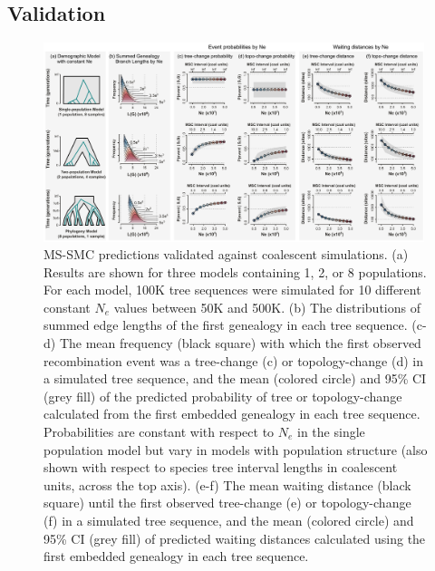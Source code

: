 \documentclass[11pt]{article}
\begin{document}
\subsection{Validation}

\begin{figure}[tp]
	\centering
	\includegraphics[width=0.99\textwidth]{figures/current/Fig5-validation-sims-NEW4.pdf}
	\caption{
		MS-SMC predictions validated against coalescent simulations.
		(a) Results are shown for three models containing 1, 2, or 8 
		populations. 
		For each model, 100K tree sequences were simulated for 10 different
		constant $N_e$ values between 50K and 500K. 
		(b) The distributions of summed edge lengths of the first genealogy in 
		each tree sequence. 
		(c-d) The mean frequency (black square) with which the first observed 
		recombination event was a tree-change (c) or topology-change (d) in a 
		simulated tree sequence, and the mean (colored circle) and 95\% CI 
		(grey fill) of the predicted probability of tree or topology-change 
		calculated from the first embedded genealogy in each tree sequence. 
		Probabilities are constant with respect to $N_e$ in the single population
		model but vary in models with population structure
		(also shown with respect to species tree interval lengths in 
		coalescent units, across the top axis).
		(e-f) The mean waiting distance (black square) until the first observed 
		tree-change (e) or topology-change (f) in a simulated tree sequence, and the mean 
		(colored circle) and 95\% CI (grey fill) of predicted waiting distances calculated
		using the first embedded genealogy in each tree sequence.
	}
	\label{fig:fig-validation}
\end{figure}
\end{document}
